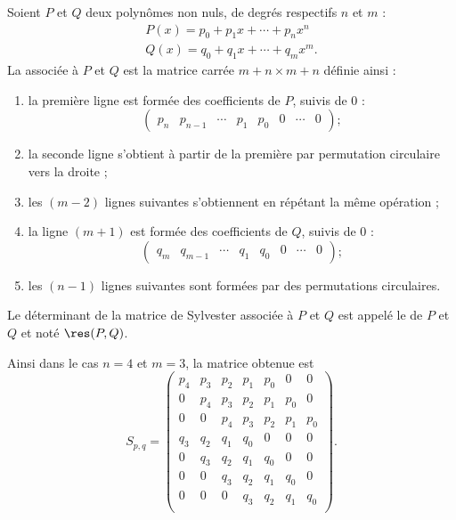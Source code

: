 \begin{definition}        \label{DEFooHGZDooXIvTaP}
	Soient \( P\) et \( Q\) deux polynômes non nuls, de degrés respectifs \( n\) et \( m\) :
	\begin{subequations}
		\begin{align}
			P(x)=p_0+p_1x+\cdots +p_nx^n \\
			Q(x)=q_0+q_1x+\cdots +q_mx^m.
		\end{align}
	\end{subequations}
	La  associée à \( P\) et \( Q\) est la matrice carrée \( m+n\times m+n\) définie ainsi :
	\begin{enumerate}
		\item
		      la première ligne est formée des coefficients de \( P\), suivis de 0 :
		      \begin{equation}
			      \begin{pmatrix} p_n & p_{n-1} & \cdots & p_1 & p_0 & 0 & \cdots & 0 \end{pmatrix} ;
		      \end{equation}
		\item la seconde ligne s'obtient à partir de la première par permutation circulaire vers la droite ;
		\item les \( (m-2)\) lignes suivantes s'obtiennent en répétant la même opération ;
		\item la ligne \( (m+1)\) est formée des coefficients de \( Q\), suivis de 0 :
		      \begin{equation}
			      \begin{pmatrix} q_m & q_{m-1} & \cdots & q_1 & q_0 & 0 & \cdots & 0 \end{pmatrix} ;
		      \end{equation}
		\item les \( (n-1)\) lignes suivantes sont formées par des permutations circulaires.
	\end{enumerate}
	Le déterminant de la matrice de Sylvester associée à \( P\) et \( Q\) est appelé le  de \( P\) et \( Q\) et noté \( \res(P,Q)\).
\end{definition}


Ainsi dans le cas \( n=4\) et \( m=3\), la matrice obtenue est
\begin{equation}    \label{EqPEgtle}
	S_{p,q}=\begin{pmatrix}
		p_4 & p_3 & p_2 & p_1 & p_0 & 0   & 0   \\
		0   & p_4 & p_3 & p_2 & p_1 & p_0 & 0   \\
		0   & 0   & p_4 & p_3 & p_2 & p_1 & p_0 \\
		q_3 & q_2 & q_1 & q_0 & 0   & 0   & 0   \\
		0   & q_3 & q_2 & q_1 & q_0 & 0   & 0   \\
		0   & 0   & q_3 & q_2 & q_1 & q_0 & 0   \\
		0   & 0   & 0   & q_3 & q_2 & q_1 & q_0 \\
	\end{pmatrix}.
\end{equation}


